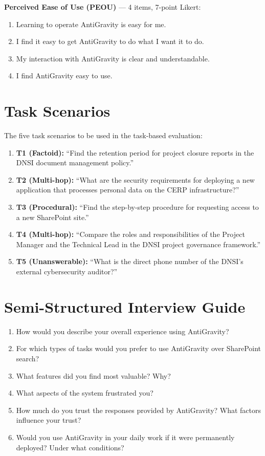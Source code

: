 \textbf{Perceived Ease of Use (PEOU)} --- 4 items, 7-point Likert:
\begin{enumerate}
  \item Learning to operate AntiGravity is easy for me.
  \item I find it easy to get AntiGravity to do what I want it to do.
  \item My interaction with AntiGravity is clear and understandable.
  \item I find AntiGravity easy to use.
\end{enumerate}

\section*{Task Scenarios}

The five task scenarios to be used in the task-based evaluation:

\begin{enumerate}
  \item \textbf{T1 (Factoid):} ``Find the retention period for project closure reports in the DNSI document management policy.''
  \item \textbf{T2 (Multi-hop):} ``What are the security requirements for deploying a new application that processes personal data on the CERP infrastructure?''
  \item \textbf{T3 (Procedural):} ``Find the step-by-step procedure for requesting access to a new SharePoint site.''
  \item \textbf{T4 (Multi-hop):} ``Compare the roles and responsibilities of the Project Manager and the Technical Lead in the DNSI project governance framework.''
  \item \textbf{T5 (Unanswerable):} ``What is the direct phone number of the DNSI's external cybersecurity auditor?''
\end{enumerate}

\section*{Semi-Structured Interview Guide}

\begin{enumerate}
  \item How would you describe your overall experience using AntiGravity?
  \item For which types of tasks would you prefer to use AntiGravity over SharePoint search?
  \item What features did you find most valuable? Why?
  \item What aspects of the system frustrated you?
  \item How much do you trust the responses provided by AntiGravity? What factors influence your trust?
  \item Would you use AntiGravity in your daily work if it were permanently deployed? Under what conditions?
\end{enumerate}
